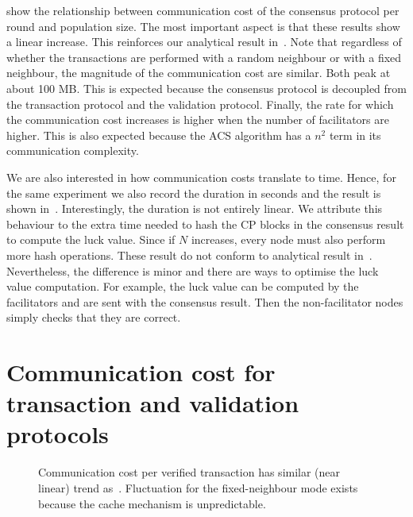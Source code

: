  show the relationship between communication cost of the consensus protocol per round and population size.
The most important aspect is that these results show a linear increase.
This reinforces our analytical result in~.
Note that regardless of whether the transactions are performed with a random neighbour or with a fixed neighbour,
the magnitude of the communication cost are similar.
Both peak at about 100 MB.
This is expected because the consensus protocol is decoupled from the transaction protocol and the validation protocol.
Finally, the rate for which the communication cost increases is higher when the number of facilitators are higher.
This is also expected because the ACS algorithm has a $n^2$ term in its communication complexity.

We are also interested in how communication costs translate to time.
Hence, for the same experiment we also record the duration in seconds and the result is shown in~.
Interestingly, the duration is not entirely linear.
We attribute this behaviour to the extra time needed to hash the CP blocks in the consensus result to compute the luck value.
Since if $N$ increases, every node must also perform more hash operations.
These result do not conform to analytical result in~.
Nevertheless, the difference is minor and there are ways to optimise the luck value computation.
For example, the luck value can be computed by the facilitators and are sent with the consensus result.
Then the non-facilitator nodes simply checks that they are correct.

\section{Communication cost for transaction and validation protocols}

\begin{figure}[h]
  \centering
  \caption{Communication cost per verified transaction has similar (near linear) trend as~.
  Fluctuation for the fixed-neighbour mode exists because the cache mechanism is unpredictable.}
  \label{fig:tx-comms}
\end{figure}

